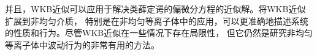 \documentclass[12pt, a4paper, oneside]{ctexart}
\begin{document}
\begin{spacing}{2.0}
并且，WKB近似可以应用于解决类薛定谔的偏微分方程的近似解。将WKB近似扩展到非均匀介质，
特别是在非均匀等离子体中的应用，可以更准确地描述系统的性质和行为。尽管WKB近似在一些情况下存在局限性，
但它仍然是研究非均匀等离子体中波动行为的非常有用的方法。








\end{spacing}{}



\end{document}
